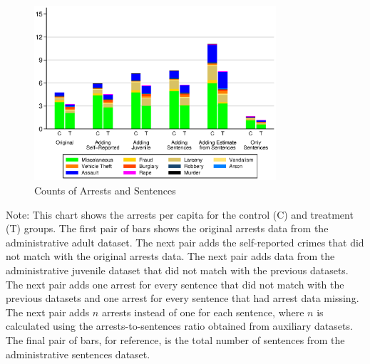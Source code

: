 \documentclass[static]{JJH-Beamer}
\begin{document}
\begin{frame}
 \addtocounter{framenumber}{-1}

\begin{figure}[H]
\caption{Counts of Arrests and Sentences}\label{fig:datagraph}
\begin{center}
\includegraphics[width=0.8\textwidth]{AppOutput/Crime/counts_misc}
\end{center}
\end{figure}

\end{frame}

{\flushleft \normalsize Note: This chart shows the arrests per capita for the control (C) and treatment (T) groups. The first pair of bars shows the original arrests data from the administrative adult dataset. The next pair adds the self-reported crimes that did not match with the original arrests data. The next pair adds data from the administrative juvenile dataset that did not match with the previous datasets. The next pair adds one arrest for every sentence that did not match with the previous datasets and one arrest for every sentence that had arrest data missing. The next pair adds $n$ arrests instead of one for each sentence, where $n$ is calculated using the arrests-to-sentences ratio obtained from auxiliary datasets. The final pair of bars, for reference, is the total number of sentences from the administrative sentences dataset.\\}
\end{document}
